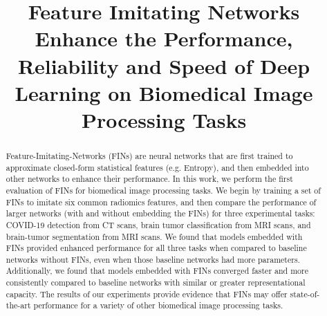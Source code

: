 \documentclass[conference]{IEEEtran}
\begin{document}
\title{Feature Imitating Networks Enhance the Performance, Reliability and Speed of
Deep Learning on Biomedical Image Processing Tasks\\

}

\author{
\small
{}
\and
{}
\and
{}
\and
{}
}

\maketitle
\begin{abstract}
Feature-Imitating-Networks (FINs) are neural networks that are first trained to approximate closed-form statistical features (e.g. Entropy), and then embedded into other networks to enhance their performance. In this work, we perform the first evaluation of FINs for biomedical image processing tasks. We begin by training a set of FINs to imitate six common radiomics features, and then compare the performance of larger networks (with and without embedding the FINs) for three experimental tasks: COVID-19 detection from CT scans, brain tumor classification from MRI scans, and brain-tumor segmentation from MRI scans. We found that models embedded with FINs provided enhanced performance for all three tasks when compared to baseline networks without FINs, even when those baseline networks had more parameters. Additionally, we found that models embedded with FINs converged faster and more consistently compared to baseline networks with similar or greater representational capacity. The results of our experiments provide evidence that FINs may offer state-of-the-art performance for a variety of other biomedical image processing tasks.
\end{abstract}
\end{document}
